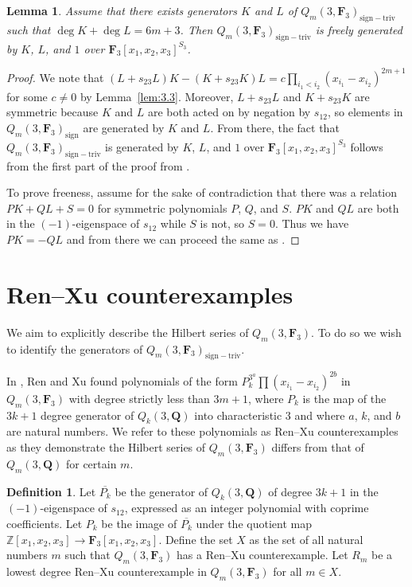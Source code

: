 \documentclass[11pt]{article}
\numberwithin{equation}{section}
\newtheorem{Lemma}[Theorem]{Lemma}
\theoremstyle{definition}
\newtheorem{Definition}[Theorem]{Definition}
\numberwithin{equation}{section}
\newcommand{\F}{\mathbf{F}}
\newcommand{\Z}{\mathbb{Z}}
\newcommand{\sign}{\mathrm{sign}}
\newcommand{\siv}{\mathrm{sign-triv}}
\begin{document}
\begin{Lemma}\label{lem:3.4}
 Assume that there exists generators $K$ and $L$ of $Q_m(3,\mathbf{F}_3)_\siv$ such that $\deg K+\deg L=6m+3$. Then $Q_m(3,\mathbf{F}_3)_\siv$ is freely generated by $K$, $L$, and $1$ over $\mathbf{F}_3[x_1,x_2,x_3]^{S_3}$.
\end{Lemma}
\begin{proof}
 We note that $(L+s_{23}L)K-(K+s_{23}K)L=c\prod_{i_1<i_2}(x_{i_1}-x_{i_2})^{2m+1}$ for some $c\neq 0$ by Lemma~\ref{lem:3.3}. Moreover, $L+s_{23}L$ and $K+s_{23}K$ are symmetric because $K$ and $L$ are both acted on by negation by $s_{12}$, so elements in $Q_m(3,\mathbf{F}_3)_{\sign}$ are generated by $K$ and $L$. From there, the fact that $Q_m(3,\mathbf{F}_3)_\siv$ is generated by $K$, $L$, and $1$ over $\mathbf{F}_3[x_1,x_2,x_3]^{S_3}$ follows from the first part of the proof from \cite{wang2022explicit}.

 To prove freeness, assume for the sake of contradiction that there was a relation $PK+QL+S=0$ for symmetric polynomials $P$, $Q$, and $S$. $PK$ and $QL$ are both in the $(-1)$-eigenspace of $s_{12}$ while $S$ is not, so $S=0$. Thus we have $PK=-QL$ and from there we can proceed the same as \cite{wang2022explicit}.

\end{proof}

\section{Ren--Xu counterexamples}\label{sec:renxu}

We aim to explicitly describe the Hilbert series of $Q_m(3,\mathbf{F}_3)$. To do so we wish to identify the generators of $Q_m(3,\mathbf{F}_3)_{\siv}$.

In \cite{Ren_2020}, Ren and Xu found polynomials of the form $P_k^{3^a}\prod (x_{i_1}-x_{i_2})^{2b}$ in $Q_m(3,\mathbf{F}_3)$ with degree strictly less than $3m+1$, where $P_k$ is the map of the $3k+1$ degree generator of $Q_k(3,\mathbf{Q})$ into characteristic $3$ and where $a$, $k$, and $b$ are natural numbers. We refer to these polynomials as Ren--Xu counterexamples as they demonstrate the Hilbert series of $Q_m(3,\mathbf{F}_3)$ differs from that of $Q_m(3,\mathbf{Q})$ for certain $m$.

\begin{Definition}
 Let $\overline{P_k}$ be the generator of $Q_k(3,\mathbf{Q})$ of degree $3k+1$ in the $(-1)$-eigenspace of $s_{12}$, expressed as an integer polynomial with coprime coefficients. Let $P_k$ be the image of $\overline{P_k}$ under the quotient map $\Z[x_1,x_2,x_3]\to\F_3[x_1,x_2,x_3]$. Define the set $X$ as the set of all natural numbers $m$ such that $Q_m(3,\mathbf{F}_3)$ has a Ren--Xu counterexample. Let $R_m$ be a lowest degree Ren--Xu counterexample in $Q_m(3,\mathbf{F}_3)$ for all $m\in X$.
\end{Definition}
\end{document}
